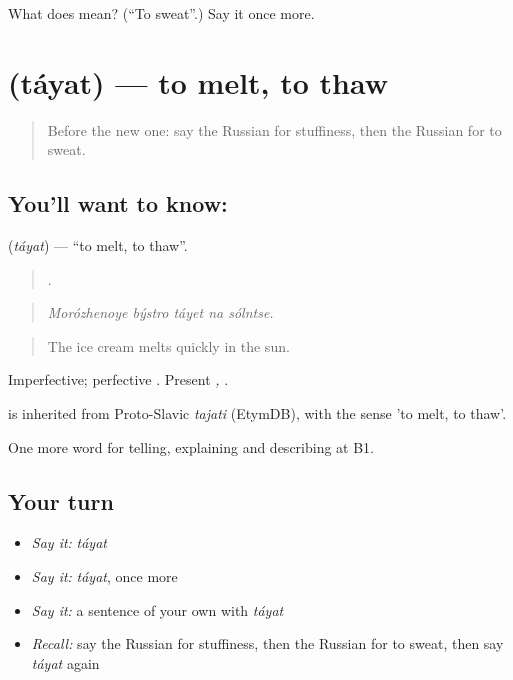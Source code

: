 \begin{tcolorbox}[breakable,colback=teal!4,colframe=teal!35!black,title={Before you move on}]
What does  mean? (\textquotedblleft{}To sweat\textquotedblright{}.) Say it once more.
\end{tcolorbox}
\section[\texorpdfstring{\ru{таять} (táyat)}{таять (táyat)}]{ (táyat) — to melt, to thaw}

\label{lesson:RU-C468-tayat}



\begin{quote}
Before the new one: say the Russian for stuffiness, then the Russian for to sweat.
\end{quote}

\subsection*{You'll want to know: }
\textbf{} (\emph{táyat}) — \textquotedblleft{}to melt, to thaw\textquotedblright{}.

\begin{quote}
    .
\end{quote}

\begin{quote}
\emph{Morózhenoye býstro táyet na sólntse.}
\end{quote}

\begin{quote}
The ice cream melts quickly in the sun.
\end{quote}

Imperfective; perfective \emph{}. Present \emph{, }.

\begin{cousinweb}
\emph{} is inherited from Proto-Slavic \emph{tajati} (EtymDB), with the sense 'to melt, to thaw'.
\end{cousinweb}

\begin{grammarlens}[title={What you've built}]
One more word for telling, explaining and describing at B1.
\end{grammarlens}

\subsection*{Your turn}
\begin{itemize}
\raggedright
  \item \emph{Say it:} \emph{táyat}
  \item \emph{Say it:} \emph{táyat}, once more
  \item \emph{Say it:} a sentence of your own with \emph{táyat}
  \item \emph{Recall:} say the Russian for stuffiness, then the Russian for to sweat, then say \emph{táyat} again
\end{itemize}

